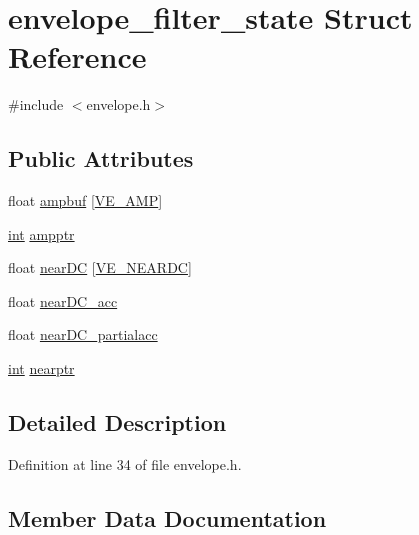 \hypertarget{structenvelope__filter__state}{}\section{envelope\+\_\+filter\+\_\+state Struct Reference}
\label{structenvelope__filter__state}


{\ttfamily \#include $<$envelope.\+h$>$}

\subsection*{Public Attributes}
\begin{DoxyCompactItemize}
\item 
float \hyperlink{structenvelope__filter__state_a4bf3a0979f375ef318ec15477ac4d982}{ampbuf} \mbox{[}\hyperlink{lib-src_2libvorbis_2lib_2_envelope_8h_acf538c31f9e77691dbcb48a5a003759c}{V\+E\+\_\+\+A\+MP}\mbox{]}
\item 
\hyperlink{xmltok_8h_a5a0d4a5641ce434f1d23533f2b2e6653}{int} \hyperlink{structenvelope__filter__state_accc7e4241fa4ad6220aaa1649ebc4f89}{ampptr}
\item 
float \hyperlink{structenvelope__filter__state_a58e86653a9251bbd8fb5bd2e6f0425c7}{near\+DC} \mbox{[}\hyperlink{lib-src_2libvorbis_2lib_2_envelope_8h_a5a9e7af3414651af544cd6eced7c6e1e}{V\+E\+\_\+\+N\+E\+A\+R\+DC}\mbox{]}
\item 
float \hyperlink{structenvelope__filter__state_ab8f2411712c79252e710896dc9ef4cb8}{near\+D\+C\+\_\+acc}
\item 
float \hyperlink{structenvelope__filter__state_a4a0afe63b73ff77a8486aa1385a617de}{near\+D\+C\+\_\+partialacc}
\item 
\hyperlink{xmltok_8h_a5a0d4a5641ce434f1d23533f2b2e6653}{int} \hyperlink{structenvelope__filter__state_ac0f52e7fd7930f3ed8b72c7d27aef47f}{nearptr}
\end{DoxyCompactItemize}


\subsection{Detailed Description}


Definition at line 34 of file envelope.\+h.



\subsection{Member Data Documentation}
